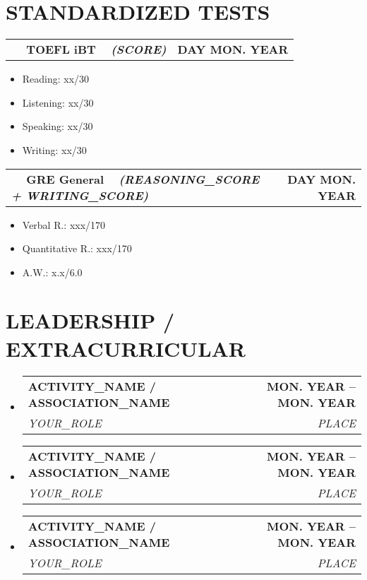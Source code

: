 \documentclass[letterpaper,11pt]{article}
\makeatletter
\newcommand{\resumeSubheading}[4]{
  \vspace{-2pt}\item
    \begin{tabular*}{1.0\textwidth}[t]{l@{\extracolsep{\fill}}r}
      \textbf{#1} & \textbf{\small #2} \\
      \textit{\small#3} & \textit{\small #4} \\
    \end{tabular*}\vspace{-7pt}
}
\newcommand{\resumeAwardHeading}[2]{
\vspace{-1pt}
\begin{tabular*}{1.001\textwidth}{l@{\extracolsep{\fill}}r}
      \small#1 & \textbf{\small #2}\\
\end{tabular*}
}
\newcommand{\resumeSubHeadingListStart}{\begin{itemize}[leftmargin=0.0in, label={}]}
\newcommand{\resumeSubHeadingListEnd}{\end{itemize}}
\makeatother
\begin{document}
\section{STANDARDIZED TESTS}
    \vspace{-1pt}
    \resumeAwardHeading{~ ~\textbf{TOEFL iBT ~ \emph{(SCORE)}}}{DAY MON. YEAR}
    \vspace{-12pt}
        \begin{multicols}{4}
            \begin{itemize}[itemsep=-5pt, parsep=3pt]
                \item\small Reading: xx/30
                \item Listening: xx/30
                \item Speaking: xx/30
                \item Writing: xx/30
            \end{itemize}
        \end{multicols}
        \vspace*{2.0\multicolsep}
        \vspace{12pt}
    
    \resumeAwardHeading{~ ~\textbf{GRE General ~ \emph{(REASONING\_SCORE + WRITING\_SCORE)}}}{DAY MON. YEAR}
    \vspace{-12pt}
        \begin{multicols}{4}
            \begin{itemize}[itemsep=-5pt, parsep=3pt]
                \item\small Verbal R.: xxx/170
                \item Quantitative R.: xxx/170
                \item A.W.: x.x/6.0
            \end{itemize}
        \end{multicols}
        \vspace{-2pt}



\section{LEADERSHIP / EXTRACURRICULAR}
    \resumeSubHeadingListStart
        \resumeSubheading{\small ACTIVITY\_NAME / ASSOCIATION\_NAME}{MON. YEAR -- MON. YEAR}{YOUR\_ROLE}{PLACE}
        \vspace{-4pt}
        \resumeSubheading{\small ACTIVITY\_NAME / ASSOCIATION\_NAME}{MON. YEAR -- MON. YEAR}{YOUR\_ROLE}{PLACE}
        \vspace{-4pt}
        \resumeSubheading{\small ACTIVITY\_NAME / ASSOCIATION\_NAME}{MON. YEAR -- MON. YEAR}{YOUR\_ROLE}{PLACE}
    \resumeSubHeadingListEnd
\end{document}
